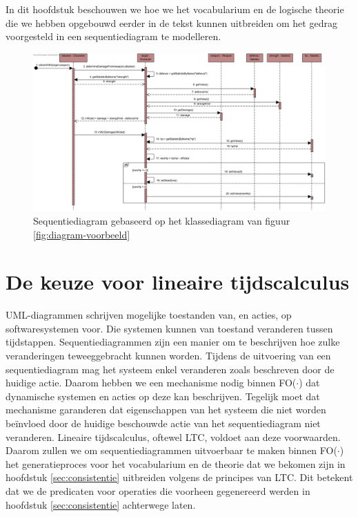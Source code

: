 In dit hoofdstuk beschouwen we hoe we het vocabularium en de logische theorie die we hebben opgebouwd eerder in de tekst kunnen uitbreiden om het gedrag voorgesteld in een sequentiediagram te modelleren.

\begin{landscape}
	\thispagestyle{empty}
\begin{figure}
	\includegraphics[width=1.5\textwidth]{chap-gedrag/seq-diagram-game.png}
	\caption{Sequentiediagram gebaseerd op het klassediagram van figuur \ref{fig:diagram-voorbeeld}}
	\label{fig:seq-diagram-game}
\end{figure}
\end{landscape}

\section{De keuze voor lineaire tijdscalculus}
UML-diagrammen schrijven mogelijke toestanden van, en acties, op softwaresystemen voor. Die systemen kunnen van toestand veranderen tussen tijdstappen. Sequentiediagrammen zijn een manier om te beschrijven hoe zulke veranderingen teweeggebracht kunnen worden. Tijdens de uitvoering van een sequentiediagram mag het systeem enkel veranderen zoals beschreven door de huidige actie. Daarom hebben we een mechanisme nodig binnen FO($\cdot$) dat dynamische systemen en acties op deze kan beschrijven. Tegelijk moet dat mechanisme garanderen dat eigenschappen van het systeem die niet worden be\"invloed door de huidige beschouwde actie van het sequentiediagram niet veranderen. Lineaire tijdscalculus\cite{BogaertsBart2014Sdsu}, oftewel LTC, voldoet aan deze voorwaarden. Daarom zullen we om sequentiediagrammen uitvoerbaar te maken binnen FO($\cdot$) het generatieproces voor het vocabularium en de theorie dat we bekomen zijn in hoofdstuk \ref{sec:consistentie} uitbreiden volgens de principes van LTC. Dit betekent dat we de predicaten voor operaties die voorheen gegenereerd werden in hoofdstuk \ref{sec:consistentie} achterwege laten.

